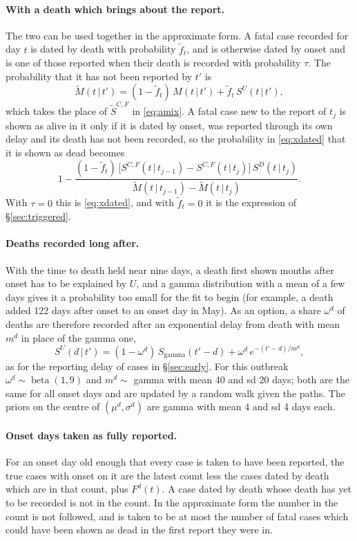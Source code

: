 \documentclass[11pt,a4paper]{article}
\newcommand{\given}{\,|\,}
\newcommand{\betad}{\operatorname{beta}}
\begin{document}
\paragraph{With a death which brings about the report.} The two can be used
together in the approximate form. A fatal case recorded for day $t$ is dated
by death with probability $\tilde{f}_t$, and is otherwise dated by onset and
is one of those reported when their death is recorded with probability
$\tau$. The probability that it has not been reported by $t'$ is
\[
\tilde{M}(t\given t')=(1-\tilde{f}_t)\,M(t\given t')+\tilde{f}_t\,S^{U}(t\given t'),
\]
which takes the place of $\tilde{S}^{C,F}$ in \eqref{eq:amix}. A fatal case
new to the report of $t_j$ is shown as alive in it only if it is dated by
onset, was reported through its own delay and its death has not been
recorded, so the probability in \eqref{eq:xdated} that it is shown as dead
becomes
\[
1-\frac{(1-\tilde{f}_t)\,\bigl[S^{C,F}(t\given t_{j-1})-S^{C,F}(t\given t_j)\bigr]\,S^{D}(t\given t_j)}
       {\tilde{M}(t\given t_{j-1})-\tilde{M}(t\given t_j)}.
\]
With $\tau=0$ this is \eqref{eq:xdated}, and with $\tilde{f}_t=0$ it is the
expression of \S\ref{sec:triggered}.

\paragraph{Deaths recorded long after.} With the time to death held near
nine days, a death first shown months after onset has to be explained by
$U$, and a gamma distribution with a mean of a few days gives it a
probability too small for the fit to begin (for example, a death added 122
days after onset to an onset day in May). As an option, a share $\omega^{d}$
of deaths are therefore recorded after an exponential delay from death with
mean $m^{d}$ in place of the gamma one,
\[
S^{U}(d\given t')=(1-\omega^{d})\,S_{\mathrm{gamma}}(t'-d)+\omega^{d}\,e^{-(t'-d)/m^{d}},
\]
as for the reporting delay of cases in \S\ref{sec:early}. For this outbreak
$\omega^{d}\sim\betad(1,9)$ and $m^{d}\sim$ gamma with mean 40 and sd 20
days; both are the same for all onset days and are updated by a random walk
given the paths. The priors on the centre of $(\mu^{d},\sigma^{d})$ are
gamma with mean 4 and sd 4 days each.

\paragraph{Onset days taken as fully reported.} For an onset day old enough
that every case is taken to have been reported, the true cases with onset on
it are the latest count less the cases dated by death which are in that
count, plus $F^{d}(t)$. A case dated by death whose death has yet to be
recorded is not in the count. In the approximate form the number in the
count is not followed, and is taken to be at most the number of fatal cases
which could have been shown as dead in the first report they were in.
\end{document}
